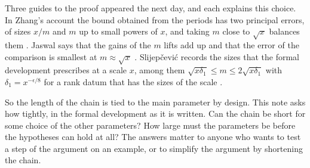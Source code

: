 \documentclass[11pt]{amsart}
\theoremstyle{definition}
\theoremstyle{remark}
\begin{document}
Three guides to the proof appeared the next day, and each explains this choice. In Zhang's account the bound obtained from the periods has two principal errors, of sizes $x/m$ and $m$ up to small powers of $x$, and taking $m$ close to $\sqrt x$ balances them \cite[p.~9; Lemma 6.1, p.~58]{Zhang}. Jaswal says that the gains of the $m$ lifts add up and that the error of the comparison is smallest at $m\approx\sqrt x$ \cite[pp.~2 and 6]{Jaswal}. Slijep\v{c}evi\'c records the sizes that the formal development prescribes at a scale $x$, among them $\sqrt{x\delta_1}\le m\le2\sqrt{x\delta_1}$ with $\delta_1=x^{-\epsilon/8}$ for a rank datum that has the sizes of the scale \cite[Definition 6.3, p.~31; Lemma 6.4, p.~32]{Slijepcevic}.

So the length of the chain is tied to the main parameter by design. This note asks how tightly, in the formal development as it is written. Can the chain be short for some choice of the other parameters? How large must the parameters be before the hypotheses can hold at all? The answers matter to anyone who wants to test a step of the argument on an example, or to simplify the argument by shortening the chain.
\end{document}
